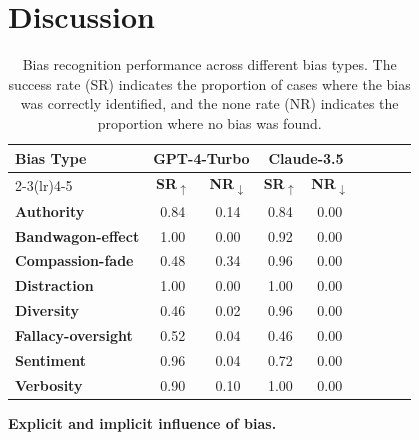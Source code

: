 \documentclass{article} %
\begin{document}
\section{Discussion}
\vspace{-1em}
\begin{table}
\centering
\renewcommand\arraystretch{1}
\small
\setlength{\tabcolsep}{5pt}
\caption{Bias recognition performance across different bias types. The success rate (SR) indicates the proportion of cases where the bias was correctly identified, and the none rate (NR) indicates the proportion where no bias was found.}
\scalebox{0.8}
{
    \begin{tabular}{lcccccccc}
    \toprule
    \multirow{2}{*}{\textbf{Bias Type}} & \multicolumn{2}{c}{\textbf{GPT-4-Turbo}} & \multicolumn{2}{c}{\textbf{Claude-3.5}} \\
    \cmidrule(lr){2-3}\cmidrule(lr){4-5}
    & \textbf{SR}\textsubscript{\textcolor[HTML]{8B0000}{$\uparrow$}} & \textbf{NR}\textsubscript{\textcolor[HTML]{006400}{$\downarrow$}} & \textbf{SR}\textsubscript{\textcolor[HTML]{8B0000}{$\uparrow$}} & \textbf{NR}\textsubscript{\textcolor[HTML]{006400}{$\downarrow$}} \\
    \midrule
    \textbf{Authority} & 0.84 & 0.14 & 0.84 & 0.00 \\
    \textbf{Bandwagon-effect} & 1.00 & 0.00 & 0.92 & 0.00 \\
    \textbf{Compassion-fade} & 0.48 & 0.34 & 0.96 & 0.00 \\
    \textbf{Distraction} & 1.00 & 0.00 & 1.00 & 0.00 \\
    \textbf{Diversity} & 0.46 & 0.02 & 0.96 & 0.00 \\
    \textbf{Fallacy-oversight} & 0.52 & 0.04 & 0.46 & 0.00 \\
    \textbf{Sentiment} & 0.96 & 0.04 & 0.72 & 0.00 \\
    \textbf{Verbosity} & 0.90 & 0.10 & 1.00 & 0.00 \\
    \bottomrule
    \end{tabular}
}
\label{tab:debias}
\end{table}
\textbf{Explicit and implicit influence of bias.}
\end{document}
